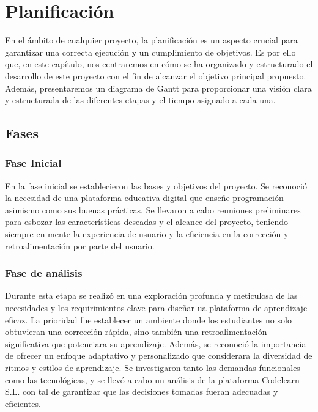 \chapter{Planificación} \label{chap:planification}

En el ámbito de cualquier proyecto, la planificación es un aspecto crucial para garantizar una correcta ejecución y un cumplimiento de objetivos. Es por ello que, en este capítulo, nos centraremos en cómo se ha organizado y estructurado el desarrollo de este proyecto con el fin de alcanzar el objetivo principal propuesto. Además, presentaremos un diagrama de Gantt para proporcionar una visión clara y estructurada de las diferentes etapas y el tiempo asignado a cada una.

\section{Fases}

\subsection{Fase Inicial}

En la fase inicial se establecieron las bases y objetivos del proyecto. Se reconoció la necesidad de una plataforma educativa digital que enseñe programación asimismo como sus buenas prácticas. Se llevaron a cabo reuniones preliminares para esbozar las características deseadas y el alcance del proyecto, teniendo siempre en mente la experiencia de usuario y la eficiencia en la corrección y retroalimentación por parte del usuario.

\subsection{Fase de análisis}

Durante esta etapa se realizó en una exploración profunda y meticulosa de las necesidades y los requirimientos clave para diseñar ua plataforma de aprendizaje eficaz. La prioridad fue establecer un ambiente donde los estudiantes no solo obtuvieran una corrección rápida, sino también una retroalimentación significativa que potenciara su aprendizaje. Además, se reconoció la importancia de ofrecer un enfoque adaptativo y personalizado que considerara la diversidad de ritmos y estilos de aprendizaje. Se investigaron tanto las demandas funcionales como las tecnológicas, y se llevó a cabo un análisis de la plataforma Codelearn S.L. con tal de garantizar que las decisiones tomadas fueran adecuadas y eficientes.

